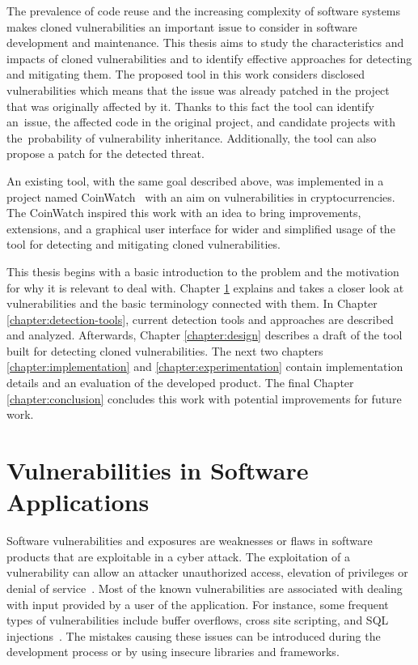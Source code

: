   The prevalence of code reuse and the increasing complexity of software systems makes cloned vulnerabilities
  an important issue to consider in software development and maintenance. This thesis aims to study the
  characteristics and impacts of cloned vulnerabilities and to identify effective approaches for detecting
  and mitigating them. The proposed tool in this work considers disclosed vulnerabilities which means
  that the issue was already patched in the project that was originally affected by it. Thanks to this fact
  the tool can identify an~issue, the affected code in the original project, and candidate projects with
  the~probability of vulnerability inheritance. Additionally, the tool can also propose a patch for
  the detected threat.

  An existing tool, with the same goal described above, was implemented in a project named CoinWatch~\cite{CoinWatch}
  with an aim on vulnerabilities in cryptocurrencies. The CoinWatch inspired this work
  with an idea to bring improvements, extensions, and a graphical user interface for wider and simplified
  usage of the tool for detecting and mitigating cloned vulnerabilities.

  This thesis begins with a basic introduction to the problem and the motivation for why it is relevant
  to deal with. Chapter \ref{chapter:vulnerabilities} explains and takes a closer look at vulnerabilities
  and the basic terminology connected with them. In Chapter \ref{chapter:detection-tools}, current detection
  tools and approaches are described and analyzed. Afterwards, Chapter \ref{chapter:design} describes
  a draft of the tool built for detecting cloned vulnerabilities. The next two chapters
  \ref{chapter:implementation} and \ref{chapter:experimentation} contain implementation details
  and an evaluation of the developed product. The final Chapter \ref{chapter:conclusion} concludes this work
  with potential improvements for future work.


\chapter{Vulnerabilities in Software Applications}
\label{chapter:vulnerabilities}
  Software vulnerabilities and exposures are weaknesses or flaws in software products that are
  exploitable in a cyber attack. The exploitation of a vulnerability can allow an attacker unauthorized
  access, elevation of privileges or denial of service~\cite{SoftwareVulnerabilities}.
  Most of the known vulnerabilities are associated with dealing with input provided by a user
  of the application. For instance, some frequent types of vulnerabilities include buffer overflows,
  cross site scripting, and SQL injections~\cite{vulnerabilities}. The mistakes causing these issues
  can be introduced during the development process or by using insecure libraries and frameworks.

